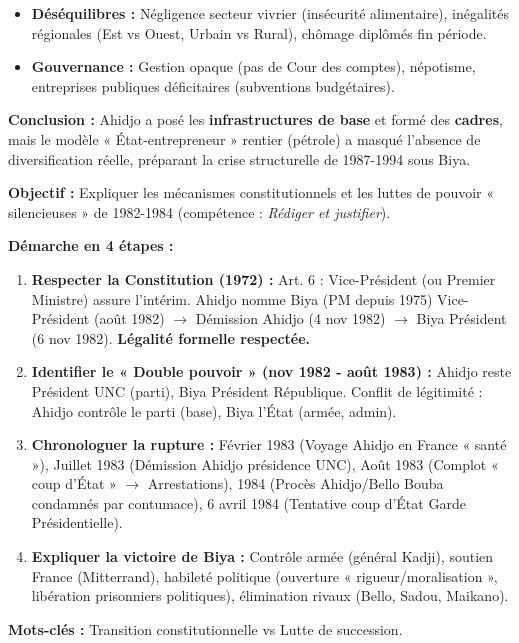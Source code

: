 \documentclass[11pt]{article}
\newcommand{\cle}[1]{{\popxbold\color{popdark}#1}}
\begin{document}
\begin{exoresolu}
\begin{itemize}
    \item \textbf{Déséquilibres :} Négligence secteur vivrier (insécurité alimentaire), inégalités régionales (Est vs Ouest, Urbain vs Rural), chômage diplômés fin période.
    \item \textbf{Gouvernance :} Gestion opaque (pas de Cour des comptes), népotisme, entreprises publiques déficitaires (subventions budgétaires).
\end{itemize}
\textbf{Conclusion :} Ahidjo a posé les \textbf{infrastructures de base} et formé des \textbf{cadres}, mais le modèle « État-entrepreneur » rentier (pétrole) a masqué l'absence de diversification réelle, préparant la crise structurelle de 1987-1994 sous Biya.
\end{exoresolu}

\begin{methode}
\textbf{Objectif :} Expliquer les mécanismes constitutionnels et les luttes de pouvoir « silencieuses » de 1982-1984 (compétence : \emph{Rédiger et justifier}).
\par
\textbf{Démarche en 4 étapes :}
\begin{enumerate}
    \item \textbf{Respecter la Constitution (1972) :} Art. 6 : Vice-Président (ou Premier Ministre) assure l'intérim. Ahidjo nomme Biya (PM depuis 1975) Vice-Président (août 1982) $\rightarrow$ Démission Ahidjo (4 nov 1982) $\rightarrow$ Biya Président (6 nov 1982). \textbf{Légalité formelle respectée.}
    \item \textbf{Identifier le « Double pouvoir » (nov 1982 - août 1983) :} Ahidjo reste Président UNC (parti), Biya Président République. Conflit de légitimité : Ahidjo contrôle le parti (base), Biya l'État (armée, admin).
    \item \textbf{Chronologuer la rupture :} Février 1983 (Voyage Ahidjo en France « santé »), Juillet 1983 (Démission Ahidjo présidence UNC), Août 1983 (Complot « coup d'État » $\rightarrow$ Arrestations), 1984 (Procès Ahidjo/Bello Bouba condamnés par contumace), 6 avril 1984 (Tentative coup d'État Garde Présidentielle).
    \item \textbf{Expliquer la victoire de Biya :} Contrôle armée (général Kadji), soutien France (Mitterrand), habileté politique (ouverture « rigueur/moralisation », libération prisonniers politiques), élimination rivaux (Bello, Sadou, Maikano).
\end{enumerate}
\textbf{Mots-clés :} \cle{Transition constitutionnelle} vs \cle{Lutte de succession}.
\end{methode}
\end{document}
